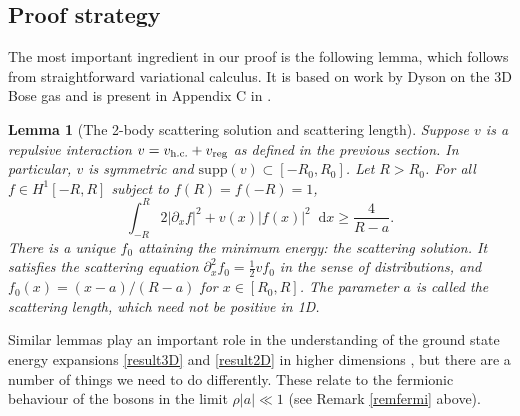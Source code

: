 \documentclass[a4paper,11pt]{article}
\newcommand{\supp}{\text{supp}}
\newcommand*\diff{\mathop{}\!\mathrm{d}}
\newtheorem{lemma}[theorem]{Lemma}
\numberwithin{equation}{section}
\begin{document}
\subsection{Proof strategy}
\label{SecProofidea}
The most important ingredient in our proof is the following lemma, which follows from straightforward variational calculus. It is based on work by Dyson on the 3D Bose gas \cite{dyson1957ground} and is present in Appendix C in \cite{lieb2006mathematics}.
\begin{lemma}[The 2-body scattering solution and scattering length]
\label{lemscatlength}
Suppose $v$ is a repulsive interaction  $v=v_{\textnormal{h.c.}}+v_{\textnormal{reg}}$ as defined in the previous section. In particular, $v$ is symmetric and $\supp(v)\subset[-R_0,R_0]$. Let $R>R_0$. For all $f\in H^1[-R,R]$ subject to $f(R)=f(-R)=1$,
\begin{equation}
\label{dyson1}
\int^R_{-R}2|\partial_xf|^2+v(x)|f(x)|^2\diff x\geq \frac{4}{R-a}.
\end{equation}
There is a unique $f_0$ attaining the minimum energy: the scattering solution. It satisfies the scattering equation $\partial_x^2f_0=\frac12vf_0$ in the sense of distributions, and $f_0(x)=(x-a)/(R-a)$ for $x\in[R_0,R]$. The parameter $a$ is called the scattering length, which need not be positive in 1D. 
\end{lemma}
Similar lemmas play an important role in the understanding of the ground state energy expansions \eqref{result3D} and \eqref{result2D} in higher dimensions \cite{dyson1957ground,lieb1998ground,lieb2001ground}, but there are a number of things we need to do differently. These relate to the fermionic behaviour of the bosons in the limit $\rho|a|\ll1$ (see Remark \ref{remfermi} above). 
\end{document}
